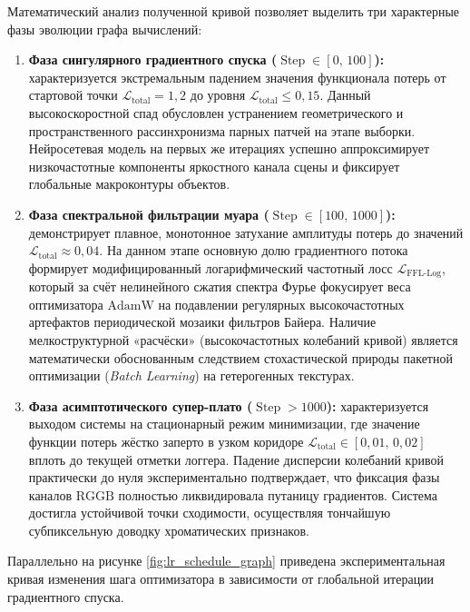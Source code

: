 \documentclass[12pt,a4paper]{article}
\begin{document}
Математический анализ полученной кривой позволяет выделить три характерные фазы эволюции графа вычислений:
\begin{enumerate}
    \item \textbf{Фаза сингулярного градиентного спуска ($\operatorname{Step} \in [0,\, 100]$):} характеризуется экстремальным падением значения функционала потерь от стартовой точки $\mathcal{L}_{\operatorname{total}} = 1{,}2$ до уровня $\mathcal{L}_{\operatorname{total}} \le 0{,}15$. Данный высокоскоростной спад обусловлен устранением геометрического и пространственного рассинхронизма парных патчей на этапе выборки. Нейросетевая модель на первых же итерациях успешно аппроксимирует низкочастотные компоненты яркостного канала сцены и фиксирует глобальные макроконтуры объектов.
    
    \item \textbf{Фаза спектральной фильтрации муара ($\operatorname{Step} \in [100,\, 1000]$):} демонстрирует плавное, монотонное затухание амплитуды потерь до значений $\mathcal{L}_{\operatorname{total}} \approx 0{,}04$. На данном этапе основную долю градиентного потока формирует модифицированный логарифмический частотный лосс $\mathcal{L}_{\operatorname{FFL-Log}}$, который за счёт нелинейного сжатия спектра Фурье фокусирует веса оптимизатора $\text{AdamW}$ на подавлении регулярных высокочастотных артефактов периодической мозаики фильтров Байера. Наличие мелкоструктурной «расчёски» (высокочастотных колебаний кривой) является математически обоснованным следствием стохастической природы пакетной оптимизации (\textit{Batch Learning}) на гетерогенных текстурах.
    
    \item \textbf{Фаза асимптотического супер-плато ($\operatorname{Step} > 1000$):} характеризуется выходом системы на стационарный режим минимизации, где значение функции потерь жёстко заперто в узком коридоре $\mathcal{L}_{\operatorname{total}} \in [0{,}01,\, 0{,}02]$ вплоть до текущей отметки логгера. Падение дисперсии колебаний кривой практически до нуля экспериментально подтверждает, что фиксация фазы каналов $\text{RGGB}$ полностью ликвидировала путаницу градиентов. Система достигла устойчивой точки сходимости, осуществляя тончайшую субпиксельную доводку хроматических признаков.
\end{enumerate}

Параллельно на рисунке \ref{fig:lr_schedule_graph} приведена экспериментальная кривая изменения шага оптимизатора в зависимости от глобальной итерации градиентного спуска.
\end{document}
